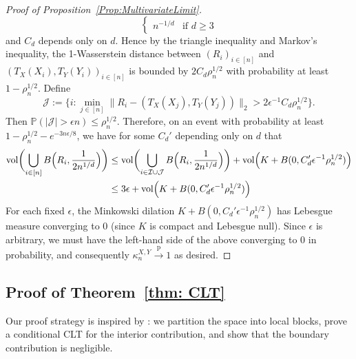 \documentclass[11pt]{article}
\newcommand{\vol}{\mathrm{vol}}
\newcommand{\pto}{\xrightarrow{\,\mathrm{p}\,} }
\begin{document}
\begin{proof}[Proof of Proposition~\ref{Prop:MultivariateLimit}]
\[\begin{cases}
    n^{-1/d} & \text{if $d\geq 3$}
\end{cases}
\]
and $C_d$ depends only on $d$. Hence by the triangle inequality and Markov's inequality, the 1-Wasserstein distance between $(R_i)_{i\in[n]}$ and  $(T_X(X_i), T_Y(Y_i))_{i\in[n]}$  is bounded by $2C_d\rho_n^{1/2}$ with probability at least $1-\rho_n^{1/2}$. Define 
\[
\mathcal{J}:=\{i: \min_{j\in[n]} \|R_i - (T_X(X_j), T_Y(Y_j))\|_2 > 2\epsilon^{-1}C_d\rho_n^{1/2}\}.
\]
Then $\mathbb{P}(|\mathcal{J}| > \epsilon n) \leq \rho_n^{1/2}$. Therefore, on an event with probability at least $1-\rho_n^{1/2}-e^{-3n\epsilon/8}$, we have for some $C_d'$ depending only on $d$ that 
\begin{align*}
\vol\biggl(\bigcup_{i\in[n]} B\Bigl(R_i, \frac{1}{2n^{1/d}}\Bigr)\biggr) &\leq \vol\biggl(\bigcup_{i\in\mathcal{I}\cup\mathcal{J}} B\Bigl(R_i, \frac{1}{2n^{1/d}}\Bigr) \biggr) + \vol\Bigl(K + B(0, C_d'\epsilon^{-1}\rho_n^{1/2})\Bigr)\\
&\leq 3\epsilon + \vol\Bigl(K + B(0, C_d'\epsilon^{-1}\rho_n^{1/2})\Bigr)
\end{align*}
For each fixed $\epsilon$, the Minkowski dilation $K + B(0, C_d'\epsilon^{-1}\rho_n^{1/2})$ has Lebesgue measure converging to $0$ (since $K$ is compact and Lebesgue null). Since $\epsilon$ is arbitrary, we must have the left-hand side of the above converging to $0$ in probability, and consequently $\kappa_n^{X,Y}\pto 1$ as desired.
\end{proof}

\subsection{Proof of Theorem~\ref{thm: CLT}}

Our proof strategy is inspired by \citet[Theorem~1]{hall1985three}: we partition the space into local blocks, prove a conditional CLT for the interior contribution, and show that the boundary contribution is negligible.
\end{document}
